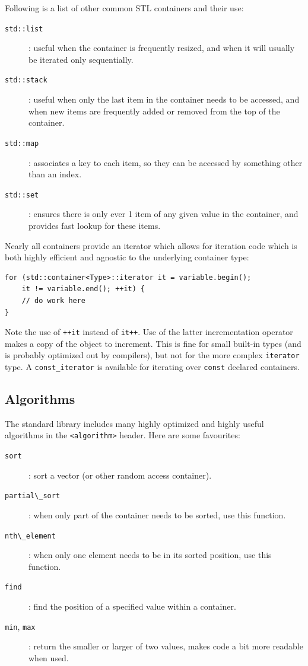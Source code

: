 \documentclass[10pt,a4paper]{book}
\begin{document}
Following is a list of other common STL containers and their use:

\begin{description}
	\item[\Verb`std::list`]: useful when the container is frequently resized, and when it will usually be iterated only sequentially.
	\item[\Verb`std::stack`]: useful when only the last item in the container needs to be accessed, and when new items are frequently added or removed from the top of the container.
	\item[\Verb`std::map`]: associates a key to each item, so they can be accessed by something other than an index.
	\item[\Verb`std::set`]: ensures there is only ever 1 item of any given value in the container, and provides fast lookup for these items.
\end{description}

Nearly all containers provide an iterator which allows for iteration code which is both highly efficient and agnostic to the underlying container type:

\begin{Verbatim}
for (std::container<Type>::iterator it = variable.begin();
    it != variable.end(); ++it) {
    // do work here
}
\end{Verbatim}

Note the use of \Verb`++it` instead of \Verb`it++`. Use of the latter incrementation operator makes a copy of the object to increment. This is fine for small built-in types (and is probably optimized out by compilers), but not for the more complex \Verb`iterator` type. A \Verb`const_iterator` is available for iterating over \verb`const` declared containers.

\subsection{Algorithms}

The standard library includes many highly optimized and highly useful algorithms in the \Verb`<algorithm>` header. Here are some favourites:

\begin{description}
	\item[\Verb`sort`]: sort a vector (or other random access container).
	\item[\Verb`partial\_sort`]: when only part of the container needs to be sorted, use this function.
	\item[\Verb`nth\_element`]: when only one element needs to be in its sorted position, use this function.
	\item[\Verb`find`]: find the position of a specified value within a container.
	\item[\Verb`min`, \Verb`max`]: return the smaller or larger of two values, makes code a bit more readable when used.
\end{description}
\end{document}
